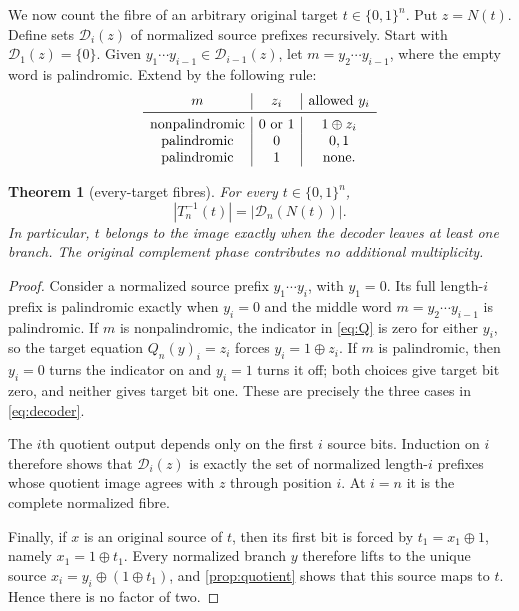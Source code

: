 \documentclass[10pt,a4paper]{amsart}
\newtheorem{theorem}{Theorem}[section]
\theoremstyle{definition}
\theoremstyle{remark}
\newcommand{\Bn}{\{0,1\}^n}
\begin{document}
We now count the fibre of an arbitrary original target $t\in\Bn$.  Put
$z=N(t)$.  Define sets $\mathcal D_i(z)$ of normalized source prefixes
recursively.  Start with $\mathcal D_1(z)=\{0\}$.  Given
$y_1\cdots y_{i-1}\in\mathcal D_{i-1}(z)$, let
$m=y_2\cdots y_{i-1}$, where the empty word is palindromic.  Extend by the
following rule:
\begin{equation}\label{eq:decoder}
\begin{array}{c|c|c}
m&z_i&\text{allowed }y_i\\ \midrule
\text{nonpalindromic}&0\text{ or }1&1\oplus z_i\\
\text{palindromic}&0&0,1\\
\text{palindromic}&1&\text{none}.
\end{array}
\end{equation}

\begin{theorem}[every-target fibres]\label{thm:fibres}
For every $t\in\Bn$,
\[
 |T_n^{-1}(t)|=|\mathcal D_n(N(t))|.
\]
In particular, $t$ belongs to the image exactly when the decoder leaves at
least one branch.  The original complement phase contributes no additional
multiplicity.
\end{theorem}

\begin{proof}
Consider a normalized source prefix $y_1\cdots y_i$, with $y_1=0$.  Its full
length-$i$ prefix is palindromic exactly when $y_i=0$ and the middle word
$m=y_2\cdots y_{i-1}$ is palindromic.  If $m$ is nonpalindromic, the indicator
in \eqref{eq:Q} is zero for either $y_i$, so the target equation
$Q_n(y)_i=z_i$ forces $y_i=1\oplus z_i$.  If $m$ is palindromic, then
$y_i=0$ turns the indicator on and $y_i=1$ turns it off; both choices give
target bit zero, and neither gives target bit one.  These are precisely the
three cases in \eqref{eq:decoder}.

The $i$th quotient output depends only on the first $i$ source bits.
Induction on $i$ therefore shows that $\mathcal D_i(z)$ is exactly the set of
normalized length-$i$ prefixes whose quotient image agrees with $z$ through
position $i$.  At $i=n$ it is the complete normalized fibre.

Finally, if $x$ is an original source of $t$, then its first bit is forced by
$t_1=x_1\oplus1$, namely $x_1=1\oplus t_1$.  Every normalized branch $y$
therefore lifts to the unique source $x_i=y_i\oplus(1\oplus t_1)$, and
\cref{prop:quotient} shows that this source maps to $t$.  Hence there is no
factor of two.
\end{proof}
\end{document}
